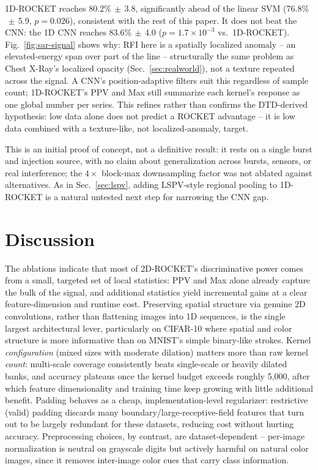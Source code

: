 \documentclass[a4paper,fleqn]{cas-sc}
\newcommand{\std}[1]{$\,\pm\,$#1}
\begin{document}
1D-ROCKET reaches 80.2\%\std{3.8}, significantly ahead of the linear SVM (76.8\%\std{5.9}, $p=0.026$), consistent with the rest of this paper. It does not beat the CNN: the 1D CNN reaches 83.6\%\std{4.0} ($p=1.7\times10^{-3}$ vs.\ 1D-ROCKET). Fig.~\ref{fig:sar-signal} shows why: RFI here is a spatially localized anomaly -- an elevated-energy span over part of the line -- structurally the same problem as Chest X-Ray's localized opacity (Sec.~\ref{sec:realworld}), not a texture repeated across the signal. A CNN's position-adaptive filters suit this regardless of sample count; 1D-ROCKET's PPV and Max still summarize each kernel's response as one global number per series. This refines rather than confirms the DTD-derived hypothesis: low data alone does not predict a ROCKET advantage -- it is low data combined with a texture-like, not localized-anomaly, target.

This is an initial proof of concept, not a definitive result: it rests on a single burst and injection source, with no claim about generalization across bursts, sensors, or real interference; the $4\times$ block-max downsampling factor was not ablated against alternatives. As in Sec.~\ref{sec:lspv}, adding LSPV-style regional pooling to 1D-ROCKET is a natural untested next step for narrowing the CNN gap.

\section{Discussion}\label{sec:discussion}

The ablations indicate that most of 2D-ROCKET's discriminative power comes from a small, targeted set of local statistics: PPV and Max alone already capture the bulk of the signal, and additional statistics yield incremental gains at a clear feature-dimension and runtime cost. Preserving spatial structure via genuine 2D convolutions, rather than flattening images into 1D sequences, is the single largest architectural lever, particularly on CIFAR-10 where spatial and color structure is more informative than on MNIST's simple binary-like strokes. Kernel \emph{configuration} (mixed sizes with moderate dilation) matters more than raw kernel \emph{count}: multi-scale coverage consistently beats single-scale or heavily dilated banks, and accuracy plateaus once the kernel budget exceeds roughly 5,000, after which feature dimensionality and training time keep growing with little additional benefit. Padding behaves as a cheap, implementation-level regularizer: restrictive (valid) padding discards many boundary/large-receptive-field features that turn out to be largely redundant for these datasets, reducing cost without hurting accuracy. Preprocessing choices, by contrast, are dataset-dependent -- per-image normalization is neutral on grayscale digits but actively harmful on natural color images, since it removes inter-image color cues that carry class information.
\end{document}
